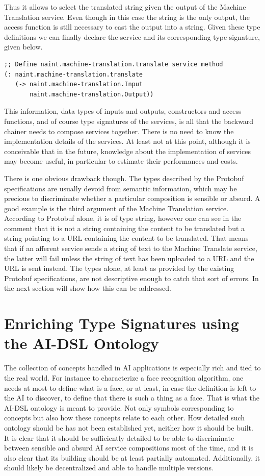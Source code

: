 \documentclass[]{report}
\begin{document}
Thus it allows to select the translated string given the output of the
Machine Translation service.  Even though in this case the string is
the only output, the access function is still necessary to cast the
output into a string.  Given these type definitions we can finally
declare the service and its corresponding type signature, given below.
\begin{verbatim}
;; Define naint.machine-translation.translate service method
(: naint.machine-translation.translate
   (-> naint.machine-translation.Input
       naint.machine-translation.Output))
\end{verbatim}
This information, data types of inputs and outputs, constructors and
access functions, and of course type signatures of the services, is
all that the backward chainer needs to compose services together.
There is no need to know the implementation details of the services.
At least not at this point, although it is conceivable that in the
future, knowledge about the implementation of services may become
useful, in particular to estimate their performances and costs.

There is one obvious drawback though.  The types described by the
Protobuf specifications are usually devoid from semantic information,
which may be precious to discriminate whether a particular composition
is sensible or absurd.  A good example is the third argument of the
Machine Translation service.  According to Protobuf alone, it is of
type string, however one can see in the comment that it is not a
string containing the content to be translated but a string pointing
to a URL containing the content to be translated.  That means that if
an afferent service sends a string of text to the Machine Translate
service, the latter will fail unless the string of text has been
uploaded to a URL and the URL is sent instead.  The types alone, at
least as provided by the existing Protobuf specifications, are not
descriptive enough to catch that sort of errors.  In the next section
will show how this can be addressed.
\section{Enriching Type Signatures using the AI-DSL Ontology}
\label{sec:ontology}
The collection of concepts handled in AI applications is especially
rich and tied to the real world.  For instance to characterize a face
recognition algorithm, one needs at most to define what is a face, or
at least, in case the definition is left to the AI to discover, to
define that there is such a thing as a face.  That is what the AI-DSL
ontology is meant to provide.  Not only symbols corresponding to
concepts but also how these concepts relate to each other.  How
detailed such ontology should be has not been established yet, neither
how it should be built.  It is clear that it should be sufficiently
detailed to be able to discriminate between sensible and absurd AI
service compositions most of the time, and it is also clear that its
building should be at least partially automated.  Additionally, it
should likely be decentralized and able to handle multiple versions.
\end{document}
